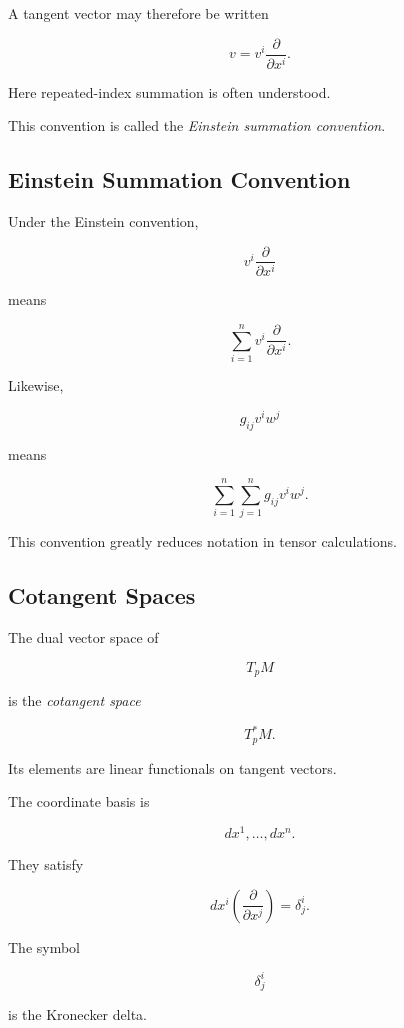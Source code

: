A tangent vector may therefore be written

\[
\boxed{
v
=
v^i
\frac{\partial}{\partial x^i}.
}
\]

Here repeated-index summation is often understood.

This convention is called the \emph{Einstein summation convention}.

\subsection{Einstein Summation Convention}
\label{subsec:einstein-summation}

Under the Einstein convention,

\[
v^i
\frac{\partial}{\partial x^i}
\]

means

\[
\sum_{i=1}^{n}
v^i
\frac{\partial}{\partial x^i}.
\]

Likewise,

\[
g_{ij}v^iw^j
\]

means

\[
\sum_{i=1}^{n}
\sum_{j=1}^{n}
g_{ij}v^iw^j.
\]

This convention greatly reduces notation in tensor calculations.

\subsection{Cotangent Spaces}
\label{subsec:cotangent-spaces}

The dual vector space of

\[
T_pM
\]

is the \emph{cotangent space}

\[
\boxed{
T_p^*M.
}
\]

Its elements are linear functionals on tangent vectors.

The coordinate basis is

\[
\boxed{
dx^1,\ldots,dx^n.
}
\]

They satisfy

\[
\boxed{
dx^i
\left(
\frac{\partial}{\partial x^j}
\right)
=
\delta^i_j.
}
\]

The symbol

\[
\delta^i_j
\]

is the Kronecker delta.

